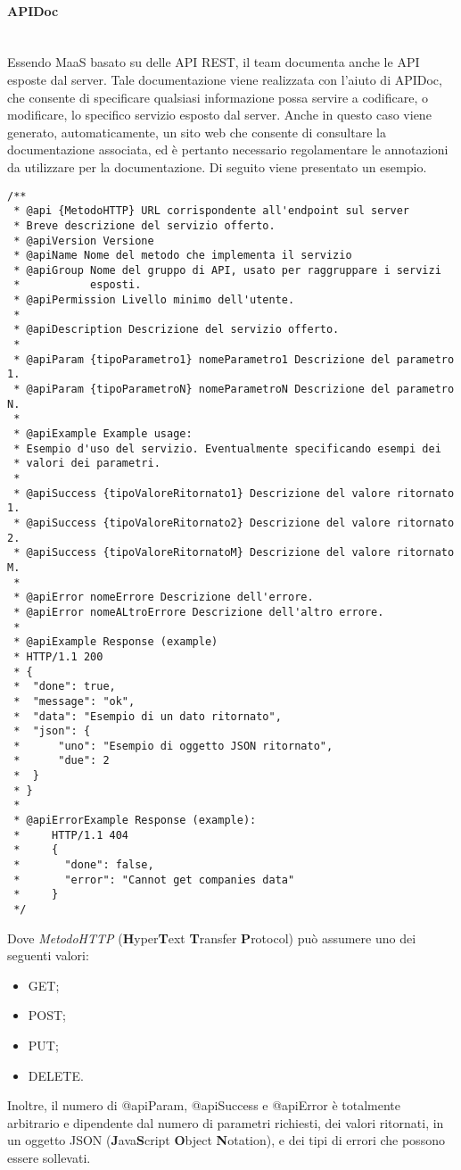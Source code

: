 \paragraph{APIDoc} \mbox{} \\
Essendo MaaS basato su delle API REST, il team documenta anche le API esposte dal server. Tale documentazione viene realizzata con l'aiuto di APIDoc, che consente di specificare qualsiasi informazione possa servire a codificare, o modificare, lo specifico servizio esposto dal server. Anche in questo caso viene generato, automaticamente, un sito web che consente di consultare la documentazione associata, ed è pertanto necessario regolamentare le annotazioni da utilizzare per la documentazione. Di seguito viene presentato un esempio.
\begin{verbatim}
/**
 * @api {MetodoHTTP} URL corrispondente all'endpoint sul server
 * Breve descrizione del servizio offerto.
 * @apiVersion Versione
 * @apiName Nome del metodo che implementa il servizio
 * @apiGroup Nome del gruppo di API, usato per raggruppare i servizi 
 *           esposti.
 * @apiPermission Livello minimo dell'utente.
 *
 * @apiDescription Descrizione del servizio offerto.
 *
 * @apiParam {tipoParametro1} nomeParametro1 Descrizione del parametro 1.
 * @apiParam {tipoParametroN} nomeParametroN Descrizione del parametro N.
 *
 * @apiExample Example usage:
 * Esempio d'uso del servizio. Eventualmente specificando esempi dei 
 * valori dei parametri.
 *
 * @apiSuccess {tipoValoreRitornato1} Descrizione del valore ritornato 1.
 * @apiSuccess {tipoValoreRitornato2} Descrizione del valore ritornato 2.
 * @apiSuccess {tipoValoreRitornatoM} Descrizione del valore ritornato M.
 *
 * @apiError nomeErrore Descrizione dell'errore.
 * @apiError nomeALtroErrore Descrizione dell'altro errore.
 *
 * @apiExample Response (example)
 * HTTP/1.1 200
 * {
 *	"done": true,
 *	"message": "ok",
 *	"data": "Esempio di un dato ritornato",
 *	"json": {
 *		"uno": "Esempio di oggetto JSON ritornato",
 *		"due": 2
 *	}
 * }
 *
 * @apiErrorExample Response (example):
 *     HTTP/1.1 404
 *     {
 *       "done": false,
 *       "error": "Cannot get companies data"
 *     }
 */
\end{verbatim}
Dove \textit{MetodoHTTP} (\textbf{H}yper\textbf{T}ext \textbf{T}ransfer \textbf{P}rotocol) può assumere uno dei seguenti valori:
\begin{itemize}
\item GET;
\item POST;
\item PUT;
\item DELETE.
\end{itemize}
Inoltre, il numero di @apiParam, @apiSuccess e @apiError è totalmente arbitrario e dipendente dal numero di parametri richiesti, dei valori ritornati, in un oggetto JSON (\textbf{J}ava\textbf{S}cript \textbf{O}bject \textbf{N}otation), e dei tipi di errori che possono essere sollevati.

